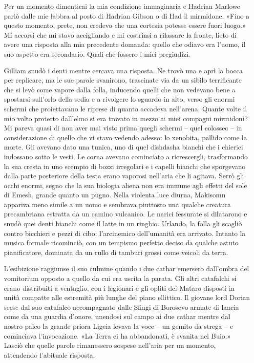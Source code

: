 Per un momento dimenticai la mia condizione immaginaria e Hadrian
Marlowe parlò dalle mie labbra al posto di Hadrian Gibson o di Had il
mirmidone. «Fino a questo momento, prete, non credevo che una cortesia
potesse essere fuori luogo.» Mi accorsi che mi stavo accigliando e mi
costrinsi a rilassare la fronte, lieto di avere una risposta alla mia
precedente domanda: quello che odiavo era l'uomo, il suo aspetto era
secondario. Quali che fossero i miei pregiudizi.

Gilliam snudò i denti mentre cercava una risposta. Ne trovò una e aprì
la bocca per replicare, ma le sue parole svanirono, trascinate via da un
sibilo terrificante che si levò come vapore dalla folla, inducendo
quelli che non vedevano bene a spostarsi sull'orlo della sedia e a
rivolgere lo sguardo in alto, verso gli enormi schermi che proiettavano
le riprese di quanto accadeva nell'arena. Quante volte il mio volto
protetto dall'elmo si era trovato in mezzo ai miei compagni mirmidoni?
Mi pareva quasi di non aver mai visto prima quegli schermi -- quel
colosseo -- in considerazione di quello che vi stavo vedendo adesso: lo
xenobita, pallido come la morte. Gli avevano dato una tunica, uno di
quel dishdasha bianchi che i chierici indossano sotto le vesti. Le corna
avevano cominciato a ricrescergli, trasformando la sua cresta in uno
scempio di bozzi irregolari e i capelli bianchi che sporgevano dalla
parte posteriore della testa erano vaporosi nell'aria che li agitava.
Serrò gli occhi enormi, segno che la sua biologia aliena non era immune
agli effetti del sole di Emesh, grande quanto un pugno. Nella violenta
luce diurna, Makisomn appariva meno simile a un uomo e sembrava
piuttosto una qualche creatura precambriana estratta da un camino
vulcanico. Le narici fessurate si dilatarono e snudò quei denti bianchi
come il latte in un ringhio. Urlando, la folla gli scagliò contro
bicchieri e pezzi di cibo: l'arcinemico dell'umanità era arrivato.
Intanto la musica formale ricominciò, con un tempismo perfetto deciso da
qualche astuto pianificatore, dominata da un rullo di tamburi grossi
come veicoli da terra.

L'esibizione raggiunse il suo culmine quando i due cathar emersero
dall'ombra del vomitorium opposto a quello da cui era uscita la parata.
Gli altri catafalchi si erano distribuiti a ventaglio, con i legionari e
gli opliti dei Mataro disposti in unità compatte alle estremità più
lunghe del piano ellittico. Il giovane lord Dorian scese dal suo
catafalco accompagnato dalle Sfingi di Borosevo armate di lancia come da
una guardia d'onore, unendosi sul campo ai due cathar mentre dal nostro
palco la grande priora Ligeia levava la voce -- un gemito da strega -- e
cominciava l'invocazione. «La Terra ci ha abbandonati, è svanita nel
Buio.» Lasciò che quelle parole rimanessero sospese nell'aria per un
momento, attendendo l'abituale risposta.

